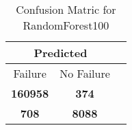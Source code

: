 \begin{table}[] 
\caption{Confusion Matric for RandomForest100} 
\label{Table: Prediction Accuracy-NoneRandomForest10080.0EKF-ignoreReflection-Reflection} 
\centering 
\begin{tabular} 
 {@{}ccc@{}} 
\toprule 
\multicolumn{2}{c}{\textbf{Predicted}}
 \\ \midrule 
\multicolumn{1}{|c|}{Failure} & 
\multicolumn{1}{c|}{No Failure}
 \\ \midrule 
\multicolumn{1}{|c|}{\color{green}\textbf{160958}} & 
\multicolumn{1}{c|}{\color{red}\textbf{374}}
 \\ \midrule 
\multicolumn{1}{|c|}{\color{red}\textbf{708}} & 
\multicolumn{1}{c|}{\color{green}\textbf{8088}}
 \\ \bottomrule 
\end{tabular} 
\end{table} 
